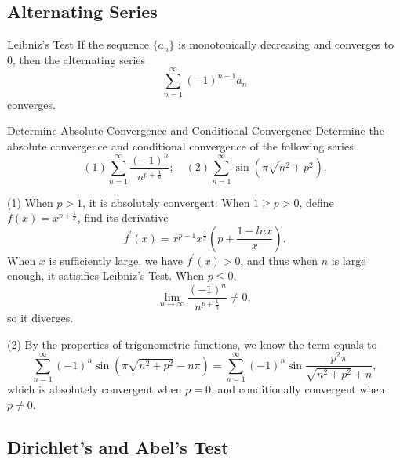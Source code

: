 \subsection{Alternating Series}

\begin{theorem}{Leibniz's Test}{}
  If the sequence $\{a_n\}$ is monotonically decreasing and converges to $0$,
  then the alternating series
  \begin{equation}
    \sum\limits_{n = 1}^{\infty}(-1)^{n-1}a_n
  \end{equation}
  converges.
\end{theorem}

\begin{example}{Determine Absolute Convergence and Conditional Convergence}{}
  Determine the absolute convergence and conditional convergence of the
  following series
  \begin{equation}
    (1) \sum\limits_{n = 1}^{\infty} \frac{(-1)^n}{n^{p+\frac{1}{n}}}; \quad
    (2) \sum\limits_{n = 1}^{\infty} \sin (\pi \sqrt{n^2 + p^2}).
  \end{equation}
\end{example}

\begin{solution}
  (1) When $p > 1$, it is absolutely convergent.
  When $1 \geq p > 0$, define $f(x) = x^{p + \frac{1}{x}}$,
  find its derivative
  \begin{equation}
    f^{\prime}(x) = x^{p-1}x^{\frac{1}{x}} \left( p + \frac{1 - ln x}{x} \right).
  \end{equation}
  When $x$ is sufficiently large, we have $f^{\prime}(x) > 0$,
  and thus when $n$ is large enough, it satisifies Leibniz's Test.
  When $p \leq 0$,
  \begin{equation}
    \lim \limits _{n \rightarrow \infty} \frac{(-1)^n}{n^{p + \frac{1}{n}}} \neq 0,
  \end{equation}
  so it diverges.

  (2) By the properties of trigonometric functions, we know
  the term equals to
  \begin{equation}
    \sum\limits_{n = 1}^{\infty} (-1)^n \sin (\pi \sqrt{n^2 + p^2} - n\pi)
    = \sum\limits_{n = 1}^{\infty}(-1)^n \sin \frac{p^2 \pi}{\sqrt{n^2 + p^2} + n},
  \end{equation}
  which is absolutely convergent when $p = 0$,
  and conditionally convergent when $p \neq 0$.
\end{solution}

\subsection{Dirichlet's and Abel's Test}

